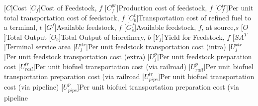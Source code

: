 \documentclass{elsart}
\begin{document}
[\ensuremath{C}]{Cost}
[\ensuremath{C_{f}}]{Cost of Feedstock, $f$}
[\ensuremath{C^{pr}_{f}}]{Production cost of feedstock, $f$}
[\ensuremath{C^{tr}_{f}}]{Per unit total transportation cost of feedstock, $f$}
[\ensuremath{C^{t}_{b}}]{Transportation cost of refined fuel to a terminal, $t$}
[\ensuremath{G^{f}}]{Available feedstock, $f$}
[\ensuremath{G^{f}_{s}}]{Available feedstock, $f$, at source,$s$}
[\ensuremath{O}]{Total Output}
[\ensuremath{O_{b}}]{Total Output of biorefinery, $b$}
[\ensuremath{Y_{f}}]{Yield for Feedstock, $f$}
[\ensuremath{SA^{T}}]{Terminal service area}
[\ensuremath{U^{itr}_{f}}]{Per unit feedstock transportation cost (intra)}
[\ensuremath{U^{xtr}_{f}}]{Per unit feedstock transportation cost (extra)}
[\ensuremath{U^{p}_{f}}]{Per unit feedstock preparation cost}
[\ensuremath{U^{tr}_{rail}}]{Per unit biofuel transportation cost (via railroad)}
[\ensuremath{U^{p}_{rail}}]{Per unit biofuel transportation preparation cost (via railroad}
[\ensuremath{U^{tr}_{pipe}}]{Per unit biofuel transportation cost (via pipeline)}
[\ensuremath{U^{p}_{pipe}}]{Per unit biofuel transportation preparation cost (via pipeline}

\end{document}
